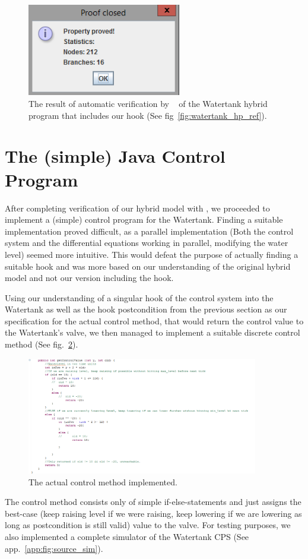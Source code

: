 \begin{figure}
	\centering
	\includegraphics[width=0.6\textwidth]{images/watertank_keym_ver}
	\caption{The result of automatic verification by \keym~ of the Watertank hybrid program that includes our hook (See fig~\ref{fig:watertank_hp_ref}).}
	\label{fig:KeymaeraVerWatertank}
\end{figure}

\section{The (simple) Java Control Program}
\label{sec:Watertank:Java}

After completing verification of our hybrid model with \keym, we proceeded to implement a (simple) control program for the Watertank. Finding a suitable implementation proved difficult, as a parallel implementation (Both the control system and the differential equations working in parallel, modifying the water level) seemed more intuitive. This would defeat the purpose of actually finding a suitable hook and was more based on our understanding of the original hybrid model and not our version including the hook.

Using our understanding of a singular hook of the control system into the Watertank as well as the hook postcondition from the previous section as our specification for the actual control method, that would return the control value to the Watertank's valve, we then managed to implement a suitable discrete control method (See fig.~\ref{fig:source_controlMethod}).

\begin{figure}
	\centering
	\includegraphics[width=0.9\textwidth]{images/source_control_method}
	\caption{The actual control method implemented.}
	\label{fig:source_controlMethod}
\end{figure}
The control method consists only of simple if-else-statements and just assigns the best-case (keep raising level if we were raising, keep lowering if we are lowering as long as postcondition is still valid) value to the valve.
For testing purposes, we also implemented a complete simulator of the Watertank CPS (See app.~\ref{app:fig:source_sim}).


